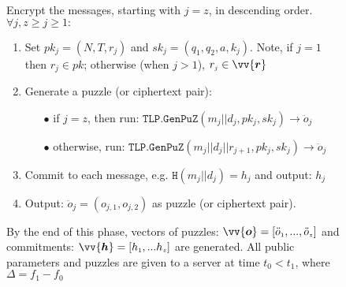 \begin{figure}
\begin{boxedminipage}{\columnwidth}
\begin{enumerate}
Encrypt the  messages, starting with $j=z$, in descending order. $\forall j, z\geq j \geq 1:$
\begin{enumerate}
\item\label{set-pk-in-loop} Set $pk_{\scriptscriptstyle j}=(N,T,r_{\scriptscriptstyle j})$ and $sk_{\scriptscriptstyle j}=(q_{\scriptscriptstyle 1},q_{\scriptscriptstyle 2},a,k_{\scriptscriptstyle j})$. Note, if $j=1$ then $r_{\scriptscriptstyle j} \in pk$; otherwise (when $j>1$), $r_{\scriptscriptstyle j} \in \vv{\bm{r}}$


\item\label{call-RTLP-GenPuz} Generate a puzzle (or ciphertext pair): 
\begin{itemize}
\item[$\bullet$]  if $j=z$, then run: $\mathtt{TLP.GenPuZ}(m_{\scriptscriptstyle j}||d_{\scriptscriptstyle j},pk_{\scriptscriptstyle j},sk_{\scriptscriptstyle j})\rightarrow \ddot{o}_{\scriptscriptstyle j}$
 
\item[$\bullet$]  otherwise, run: $\mathtt{TLP.GenPuZ}(m_{\scriptscriptstyle j}||d_{\scriptscriptstyle j}||r_{\scriptscriptstyle j+1},pk_{\scriptscriptstyle j},sk_{\scriptscriptstyle j})\rightarrow \ddot{o}_{\scriptscriptstyle j}$
\end{itemize}


\item\label{commit-} Commit to each message, e.g. $\mathtt{H}(m_{\scriptscriptstyle j}||d_{\scriptscriptstyle j})=h_{\scriptscriptstyle j}$ and output:  $h_{\scriptscriptstyle j}$ 
 
\item Output: $\ddot{o}_{\scriptscriptstyle j}=(o_{\scriptscriptstyle j,1},o_{\scriptscriptstyle j,2})$ as puzzle (or ciphertext pair). 

\end{enumerate}
By the end of this phase,  vectors of puzzles: $\vv{\bm{o}}=[\ddot{o}_{\scriptscriptstyle 1},..., \ddot{o}_{\scriptscriptstyle z}]$ and commitments: $\vv{\bm{h}}=[h_{\scriptscriptstyle 1},...h_{\scriptscriptstyle z}]$ are generated. All public parameters and puzzles are given to a server at time $t_{\scriptscriptstyle 0}<t_{\scriptscriptstyle1}$, where  $\Delta=f_{\scriptscriptstyle 1}-f_{\scriptscriptstyle 0}$ %





\end{enumerate}
\end{boxedminipage}
\end{figure}
